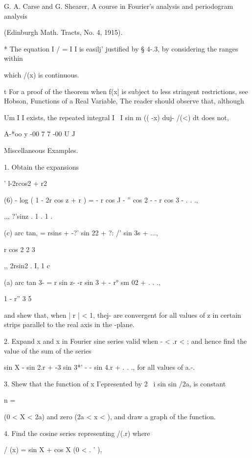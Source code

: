 G. A. Carse and G. Shearer, A course in Fourier's analysis and
periodogram analysis

(Edinburgh Math. Tracts, No. 4, 1915).

* The equation I / = I I is easilj' justified by § 4-.3, by
considering the ranges within

which /(x) is continuous.

t For a proof of the theorem when f(x] is subject to less stringent
restrictions, see Hobson, Functions of a Real Variable, %
The reader should observe that, although

Um I I exists, the repeated integral I \ I sin m (( -x) duj- /(<) dt
does not,

A-*oo y -00 7 7 -00 U J

%
%

Miscellaneous Examples.

1. Obtain the expansions

  ' l-2rcos2 + r2

(6) - log ( 1 - 2r cos z + r ) = - r cos J - '' cos 2 - - r cos 3 - .
. .,

,,, ?'sinz . 1 . 1 . \,

(c) arc tan, = rsins + -?' sin 22 + ?: /' sin 3s + ...,

   r cos 2 2 3

,, 2rsin2 . I,  1 c

(a) arc tan 3- = r sin z- -r sin 3 + - r° sm 02 + . . .,

1 - r'' 3 5

and shew that, when | r | < 1, thej- are convergent for all values of
z in certain strips parallel to the real axis in the -plane.

2. Expand x and x in Fourier sine series valid when - \pi < .r < \pi;
and hence find the value of the sum of the series

sin X - sin 2.r + -3 sin 3*' - - sin 4.r + . . ., for all values of
a.-. 

3. Shew that the function of x I'epresented by 2 ~i sin sin /2a, is
constant

n = \

(0 < X < 2a) and zero (2a < x < \pi), and draw a graph of the function.


4. Find the cosine series representing /(.r) where

/ (x) = sin X + cos X (0 < . ' \pi ),

